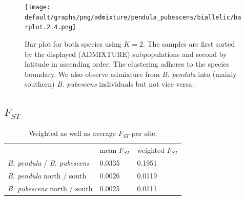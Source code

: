 \documentclass[hidelinks,11pt]{article}
\newcommand{\pendula}{\textit{B. pendula}}
\newcommand{\pubescens}{\textit{B. pubescens}}
\begin{document}
{    \begin{figure}[H]
        \centering
        \texttt{[image: default/graphs/png/admixture/pendula\_pubescens/biallelic/barplot.2.4.png]}
        \caption{Bar plot for both species using $K=2$. The samples are first sorted by the displayed (\mbox{ADMIXTURE}) subpopulations and second by latitude in ascending order. The clustering adheres to the species boundary. We also observe admixture from \pendula{} into (mainly southern) \pubescens{} individuals but not vice versa.}
        \label{fig:admixture_barplot_pendula_pubescens_2}
    \end{figure}

    \subsection{$F_{ST}$}
    \label{sec:fst}

    \begin{table}[H]
        \begin{center}
            \begin{tabular}{| l | l | l |}
                & mean $F_{ST}$ & weighted $F_{ST}$ \\
                \pendula{} / \pubescens    & 0.0335        & 0.1951            \\
                \pendula{} north / south   & 0.0026        & 0.0119            \\
                \pubescens{} north / south & 0.0025        & 0.0111            \\
            \end{tabular}
        \end{center}
        \caption{Weighted as well as average $F_{ST}$ per site.}
        \label{tbl:fst}
    \end{table}

}
\end{document}
